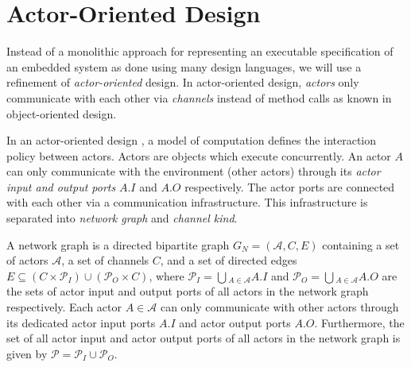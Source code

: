 
\section{Actor-Oriented Design}\label{actor-oriented-design}

Instead of a monolithic approach for representing an executable specification
of an embedded system as done using many design languages,
we will use a refinement of \emph{actor-oriented} design.
In actor-oriented design, \emph{actors} only
communicate with each other via \emph{channels} instead of method calls as known
in object-oriented design.

In an actor-oriented design \cite{agha97abstracting:1997}, a model of computation defines
\cite{embsft:2002} the interaction policy between actors.
Actors are objects which execute concurrently. An actor $A$ can only
communicate with the environment (other actors) through its
\emph{actor input and output ports} $A.I$ and $A.O$ respectively.
The actor ports are connected with each other via a communication
infrastructure. This infrastructure is separated into \emph{network graph} and
\emph{channel kind}.




\begin{sdefinition}\label{network-graph}
A network graph is a directed bipartite graph $G_N=(\mathcal{A},C,E)$ containing
a set of actors $\mathcal{A}$, a set of channels $C$, and a set of
directed edges $E \subseteq (C \times \mathcal{P}_I)
\cup (\mathcal{P}_O \times C)$, where
$\mathcal{P}_I = \bigcup{}_{A \in \mathcal{A}} A.I$ and
$\mathcal{P}_O = \bigcup{}_{A \in \mathcal{A}} A.O$
are the sets of actor input and output ports of all actors in the network graph
respectively. Each actor $A \in \mathcal{A}$ can only communicate with other
actors through its dedicated actor input ports $A.I$ and actor output ports $A.O$.
Furthermore, the set of all actor input and actor output ports of all actors in
the network graph is given by $\mathcal{P} = \mathcal{P}_I \cup \mathcal{P}_O$.
\end{sdefinition}

